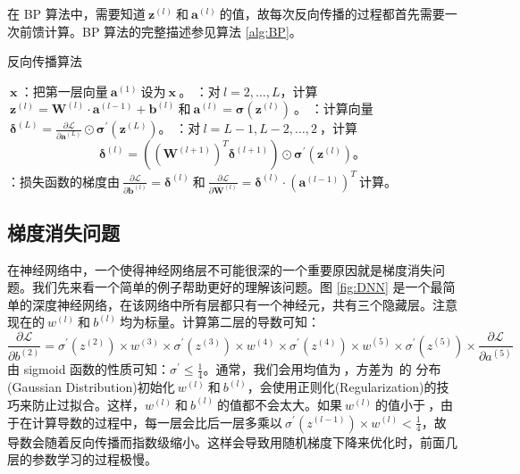 \documentclass[12pt,a4paper]{article}
\begin{document}
在 {\crimson BP} 算法中，需要知道$\:\bm{z}^{(l)}\:$和$\:\bm{a}^{(l)}\:$的值，故每次反向传播的过程都首先需要一次前馈计算。{\crimson BP} 算法的完整描述参见算法 {\kai \ref{alg:BP}}。

\begin{algorithm}
\caption{\kai 反向传播算法}               %
\label{alg:BP}                         %
\begin{algorithmic}[1]
\kai
{}$\:\bm{x}\:$：把第一层向量$\:\bm{a}^{(1)}\:$设为$\:\bm{x}\:$。
：对$\:l = 2,\ldots,L$，计算$\:\bm{z}^{(l)} = \bm{W}^{(l)}\cdot\bm{a}^{(l-1)} + \bm{b}^{(l)}\:$和$\:\bm{a}^{(l)} = \bm{\sigma}(\bm{z}^{(l)})\:$。
：计算向量$\:\bm{\delta}^{(L)} = \frac{\partial \mathcal{L}}{\partial \bm{a}^{(L)}} \odot \bm{\sigma}^{'}(\bm{z}^{(L)})$。
：对$\:l=L-1, L-2,\ldots, 2\:$，计算
$$\bm{\delta}^{(l)} = ((\bm{W}^{(l+1)})^T \bm{\delta}^{(l+1)}) \odot \bm{\sigma}^{'}(\bm{z}^{(l)})。$$
：损失函数的梯度由$\:\frac{\partial \mathcal{L}}{\partial \bm{b}^{(l)}} = \bm{\delta}^{(l)}\:$和$\:\frac{\partial \mathcal{L}}{\partial \bm{W}^{(l)}} = \bm{\delta}^{(l)} \cdot (\bm{a}^{(l-1)})^T\:$计算。
\end{algorithmic}
\end{algorithm}

\subsection{梯度消失问题}

在神经网络中，一个使得神经网络层不可能很深的一个重要原因就是梯度消失问题。我们先来看一个简单的例子帮助更好的理解该问题。图 {\kai \ref{fig:DNN}} 是一个最简单的深度神经网络，在该网络中所有层都只有一个神经元，共有三个隐藏层。注意现在的$\:w^{(l)}\:$和$\:b^{(l)}\:$均为标量。计算第二层的导数可知：
\begin{equation}
\frac{\partial \mathcal{L}}{\partial b^{(2)}} = \sigma^{'}(z^{(2)})\times w^{(3)}\times \sigma^{'}(z^{(3)})\times w^{(4)}\times \sigma^{'}(z^{(4)})\times w^{(5)}\times \sigma^{'}(z^{(5)})\times \frac{\partial \mathcal{L}}{\partial a^{(5)}}
\end{equation}
由 {\crimson sigmoid} 函数的性质可知：$\sigma^{'} \le \frac{1}{4}$。通常，我们会用均值为$\:${}，方差为$\:${}$\:$的 { 分布}({\crimson Gaussian Distribution})初始化$\:w^{(l)}\:$和$\:b^{(l)}$，会使用{\hei 正则化}({\crimson Regularization})的技巧来防止过拟合。这样，$w^{(l)}\:$和$\:b^{(l)}\:$的值都不会太大。如果$\:w^{(l)}\:$的值小于$\:${}，由于在计算导数的过程中，每一层会比后一层多乘以$\:\sigma^{'}(z^{(l-1)})\times w^{(l)} < \frac{1}{4}$，故导数会随着反向传播而指数级缩小。这样会导致用随机梯度下降来优化时，前面几层的参数学习的过程极慢。
\end{document}
